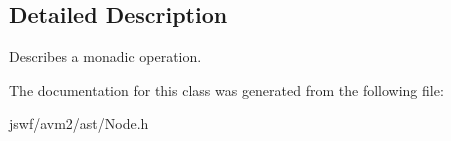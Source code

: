 \subsection{Detailed Description}
Describes a monadic operation. 

The documentation for this class was generated from the following file\+:\begin{DoxyCompactItemize}
\item 
jswf/avm2/ast/Node.\+h\end{DoxyCompactItemize}

